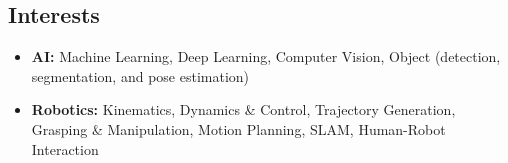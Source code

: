 \documentclass[10pt, oneside]{article} %
\begin{document}
\begin{paracol}{2}


\section{Interests}


\begin{itemize}[leftmargin=*, topsep=0pt, label={}]
	
	\item{\textbf{AI:} Machine Learning, Deep Learning, Computer Vision, Object (detection, segmentation, and pose estimation)}
	
	\item{\textbf{Robotics:} Kinematics, Dynamics \& Control, Trajectory Generation, Grasping \& Manipulation, Motion Planning, SLAM, Human-Robot Interaction} %


\end{itemize}
\end{paracol}
\end{document}
